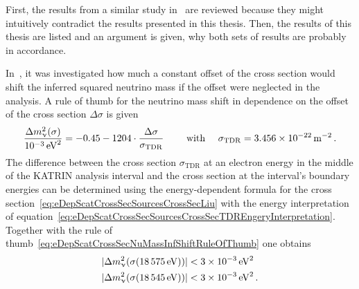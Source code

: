 First, the results from a similar study in~\cite{Groh2015} are reviewed because they might intuitively contradict the results presented in this thesis. Then, the results of this thesis are listed and an argument is given, why both sets of results are probably in accordance.

In~\cite{Groh2015}, it was investigated how much a constant offset of the cross section would shift the inferred squared neutrino mass if the offset were neglected in the analysis. A rule of thumb for the neutrino mass shift in dependence on the offset of the cross section $\Delta\sigma$ is given~\cite{Groh2015}
\begin{equation}
	\label{eq:eDepScatCrossSecNuMassInfShiftRuleOfThumb}
	\frac{\Delta m_\upnu^2(\sigma)}{\SI{e-3}{eV^2}} =
	-0.45
	-1204\cdot
	\frac{
		\Delta\sigma
	}{
		\sigma_\mathrm{TDR}
	}
	\qquad \text{ with } \quad 
	\sigma_\mathrm{TDR} = \SI{3.456e-22}{m^{-2}}
	\text{\,.}
\end{equation}
The difference between the cross section $\sigma_\mathrm{TDR}$ at an electron energy in the middle of the KATRIN analysis interval and the cross section at the interval's boundary energies can be determined using the energy-dependent formula for the cross section~\eqref{eq:eDepScatCrossSecSourcesCrossSecLiu} with the energy interpretation of equation~\eqref{eq:eDepScatCrossSecSourcesCrossSecTDREngeryInterpretation}. Together with the rule of thumb~\eqref{eq:eDepScatCrossSecNuMassInfShiftRuleOfThumb} one obtains
\begin{align*}
	\label{eq:eDepScatCrossSecNuMassInfShiftsByGroh}
	\lvert\Delta m_\upnu^2(\sigma(\SI{18575}{eV}))\rvert &< \SI{3e-3}{eV^2} \\
	\lvert\Delta m_\upnu^2(\sigma(\SI{18545}{eV}))\rvert &< \SI{3e-3}{eV^2} 
	\text{\,.}
\end{align*}

